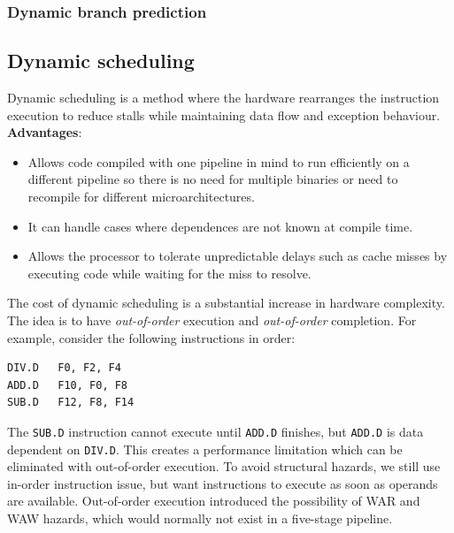 \documentclass[11pt]{article}
\begin{document}
\subsubsection{Dynamic branch prediction}


\subsection{Dynamic scheduling}
Dynamic scheduling is a method where the hardware rearranges the instruction execution to reduce stalls while maintaining data flow and exception behaviour. 
\n
\textbf{Advantages}:
\begin{itemize}
\item Allows code compiled with one pipeline in mind to run efficiently on a different pipeline so there is no need for multiple binaries or need to recompile for different microarchitectures. 
\item It can handle cases where dependences are not known at compile time. 
\item Allows the processor to tolerate unpredictable delays such as cache misses by executing code while waiting for the miss to resolve. 
\end{itemize}
\noindent
The cost of dynamic scheduling is a substantial increase in hardware complexity.
\n
The idea is to have \textit{out-of-order} execution and \textit{out-of-order} completion. For example, consider the following instructions in order:
\begin{lstlisting}
DIV.D	F0, F2, F4
ADD.D	F10, F0, F8
SUB.D	F12, F8, F14
\end{lstlisting}
\noindent
The \texttt{SUB.D} instruction cannot execute until \texttt{ADD.D} finishes, but \texttt{ADD.D} is data dependent on \texttt{DIV.D}. This creates a performance limitation which can be eliminated with out-of-order execution. To avoid structural hazards, we still use in-order instruction issue, but want instructions to execute as soon as operands are available.
\n
Out-of-order execution introduced the possibility of WAR and WAW hazards, which would normally not exist in a five-stage pipeline. 
\end{document}
